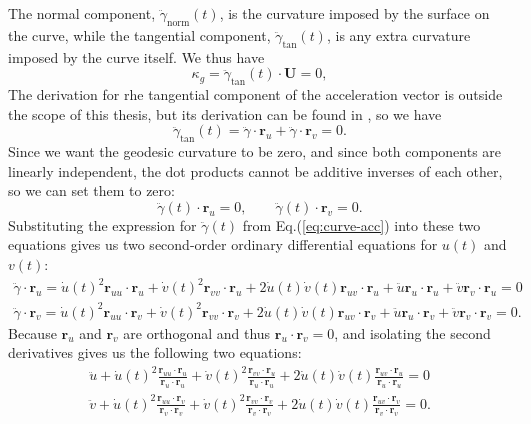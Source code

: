 \documentclass[12pt]{article}
\begin{document}
The normal component, $\ddot{\gamma}_{\text{norm}}(t)$, is the curvature imposed by the surface on the curve, while the tangential component, $\ddot{\gamma}_{\text{tan}}(t)$, is any extra curvature imposed by the curve itself.
We thus have
\[
	\kappa_{g} = \ddot{\gamma}_{\text{tan}}(t) \cdot \mathbf{U} = 0,
\]
The derivation for rhe tangential component of the acceleration vector is outside the scope of this thesis, but its derivation can be found in \cite{celano2022why}\cite{oprea2007differential}, so we have 
\[
	\ddot{\gamma}_{\text{tan}}(t) = \ddot{\gamma} \cdot \mathbf{r}_{u} + \ddot{\gamma} \cdot \mathbf{r}_{v} = 0.
\]
Since we want the geodesic curvature to be zero, and since both components are linearly independent, the dot products cannot be additive inverses of each other, so we can set them to zero:
\[
	\ddot{\gamma}(t) \cdot \mathbf{r}_{u} = 0, \qquad \ddot{\gamma}(t) \cdot \mathbf{r}_{v} = 0.
\]	
Substituting the expression for $\ddot{\gamma}(t)$ from Eq.(\ref{eq:curve-acc}) into these two equations gives us two second-order ordinary differential equations for $u(t)$ and $v(t)$:
\begin{align*}
	\ddot{\gamma} \cdot \mathbf{r}_{u} = \dot{u}(t)^{2}\mathbf{r}_{uu} \cdot \mathbf{r}_{u} + \dot{v}(t)^{2}\mathbf{r}_{vv} \cdot \mathbf{r}_{u} + 2\dot{u}(t)\dot{v}(t)\mathbf{r}_{uv} \cdot \mathbf{r}_{u} + \ddot{u}\mathbf{r}_{u} \cdot \mathbf{r}_{u} + \ddot{v}\mathbf{r}_{v} \cdot \mathbf{r}_{u} = 0 \\
	\ddot{\gamma} \cdot \mathbf{r}_{v} = \dot{u}(t)^{2}\mathbf{r}_{uu} \cdot \mathbf{r}_{v} + \dot{v}(t)^{2}\mathbf{r}_{vv} \cdot \mathbf{r}_{v} + 2\dot{u}(t)\dot{v}(t)\mathbf{r}_{uv} \cdot \mathbf{r}_{v} + \ddot{u}\mathbf{r}_{u} \cdot \mathbf{r}_{v} + \ddot{v}\mathbf{r}_{v} \cdot \mathbf{r}_{v} = 0. 
\end{align*}
Because $\mathbf{r}_{u}$ and $\mathbf{r}_{v}$ are orthogonal and thus $\mathbf{r}_{u}\cdot\mathbf{r}_{v} = 0$, and isolating the second derivatives gives us the following two equations:
\begin{align}
	\ddot{u} + \dot{u}(t)^{2}\frac{\mathbf{r}_{uu} \cdot \mathbf{r}_{u}}{\mathbf{r}_{u} \cdot \mathbf{r}_{u}} + \dot{v}(t)^{2}\frac{\mathbf{r}_{vv} \cdot \mathbf{r}_{u}}{\mathbf{r}_{u} \cdot \mathbf{r}_{u}} + 2\dot{u}(t)\dot{v}(t)\frac{\mathbf{r}_{uv} \cdot \mathbf{r}_{u}}{\mathbf{r}_{u} \cdot \mathbf{r}_{u}} = 0 \label{eq:geodesic-acc-decomp-1}\\
	\ddot{v} + \dot{u}(t)^{2}\frac{\mathbf{r}_{uu} \cdot \mathbf{r}_{v}}{\mathbf{r}_{v} \cdot \mathbf{r}_{v}} + \dot{v}(t)^{2}\frac{\mathbf{r}_{vv} \cdot \mathbf{r}_{v}}{\mathbf{r}_{v} \cdot \mathbf{r}_{v}} + 2\dot{u}(t)\dot{v}(t)\frac{\mathbf{r}_{uv} \cdot \mathbf{r}_{v}}{\mathbf{r}_{v} \cdot \mathbf{r}_{v}} = 0. \label{eq:geodesic-acc-decomp-2}
\end{align}
\end{document}
